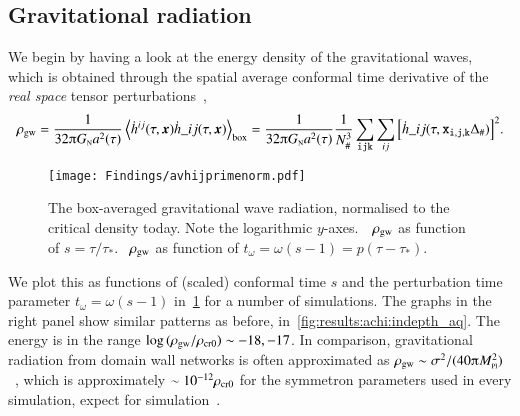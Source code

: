\subsection{Gravitational radiation}\label{sec:results:h11:rho_gw}
    We begin by having a look at the energy density of the gravitational waves, which is obtained through the spatial average conformal time derivative of the \emph{real space} tensor perturbations~\citep{kawasakiStudyGravitationalRadiation2011},
    \begin{equation}\label{eq:results:h11:rho_gw}
        \rho\ped{gw} = \frac{1}{32\ppi G\nped{N}a^2(\tau)} \left\langle \dot{h}\^{ij}(\tau, \vec{x})\dot{h}\_{ij}(\tau, \vec{x}) \right\rangle_{\mathrm{box}} =  \frac{1}{32\ppi G\nped{N}a^2(\tau)} \frac{1}{N_\#^3} \sum_{\lcoord{i}\lcoord{j}\lcoord{k}} \sum_{ij} \bclosed{\dot{h}\_{ij}(\tau,\lcoord{x}_{\lcoord{i}, \lcoord{j}, \lcoord{k}} \Delta_\# )}^2.
    \end{equation}
    \begin{figure}[ht]
        \centering
        \texttt{[image: Findings/avhijprimenorm.pdf]}
        \caption{The box-averaged gravitational wave radiation, normalised to the critical density today. Note the logarithmic $y$-axes.~~$\rho_\mathrm{gw}$ as function of $s=\tau/\tau_\ast$. ~$\rho_\mathrm{gw}$ as function of $t_\omega = \omega(s-1)= p(\tau-\tau_\ast)$.}
        \label{fig:results:h11:avhijprimenorm}
    \end{figure}
    We plot this as functions of (scaled) conformal time $s$ and the perturbation time parameter $t_\omega = \omega(s-1)$ in~\cref{fig:results:h11:avhijprimenorm} for a number of simulations. %
    The graphs in the right panel show similar patterns as before, in~\cref{fig:results:achi:indepth_aq}. %
    The energy is in the range $\log{(\rho\ensuremath{_\mathrm{gw}}/\rho\ensuremath{_\mathrm{cr0}})}\sim-18, -17$. In comparison, gravitational radiation from domain wall networks is often approximated as $\rho\ped{gw}\sim \sigma^2 /(40\ppi M\nped{Pl}^2)$~\citep{ramazanovFreezeinDarkMatter2022}, which is approximately $ \sim 10^{-12}\rho_\mathrm{cr0}$ for the symmetron parameters used in every simulation, expect for simulation~.
    
    


